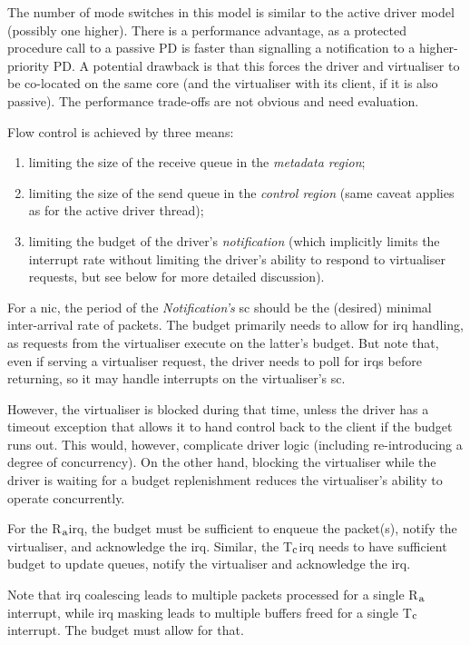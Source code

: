 \documentclass[a4paper,12pt]{report}
\newcommand{\Obj}[1]{\textsl{#1}}
\newcommand{\Ra}{R\(_{\mbox{\footnotesize a}}\)\xspace}
\newcommand{\Tc}{T\(_{\mbox{\footnotesize c}}\)\xspace}
\begin{document}
The number of mode switches in this model is similar to the active
driver model (possibly one higher). There is a performance advantage,
as a protected procedure call to a passive PD is faster than
signalling a notification to a higher-priority PD. A potential
drawback is that this forces the driver and virtualiser to be
co-located on the same core (and the virtualiser with its client, if
it is also passive). The performance trade-offs are not obvious and
need evaluation.

Flow control is achieved by three means:
\begin{enumerate}
\item limiting the size of the receive queue in the \Obj{metadata
  region};
\item limiting the size of the send queue in the \Obj{control
    region} (same caveat applies as for the active driver thread);
\item limiting the budget of the driver's \Obj{notification} (which
  implicitly limits the interrupt rate without limiting the driver's
  ability to respond to virtualiser requests, but see below for more
  detailed discussion).
\end{enumerate}

For a \gls{nic}, the period of the \Obj{Notification's} \gls{sc} should be the
(desired) minimal
inter-arrival rate of packets. The budget primarily needs to allow for \gls{irq}
handling, as requests from the virtualiser execute on the latter's budget. But
note that, even if serving a virtualiser request, the driver needs to poll
for \glspl{irq} before returning, so it may handle interrupts
on the virtualiser's \gls{sc}.

However, the virtualiser is blocked during that time, unless the driver has
a timeout exception that allows it to hand control back to the client
if the budget runs out. This would, however, complicate driver logic
(including re-introducing a degree of concurrency). On the other hand,
blocking the virtualiser while the driver is waiting for a budget
replenishment reduces the virtualiser's ability to operate concurrently.

For the \Ra \gls{irq}, the budget must be sufficient to enqueue
the packet(s), notify the virtualiser, and acknowledge the \gls{irq}. Similar, the \Tc \gls{irq} needs to
have sufficient budget to update queues, notify the virtualiser and
acknowledge the \gls{irq}.

Note that \gls{irq} coalescing leads to multiple packets processed for a
single \Ra interrupt, while \gls{irq} masking leads to multiple
buffers freed for a single \Tc interrupt. The budget must allow
for that.
\end{document}
